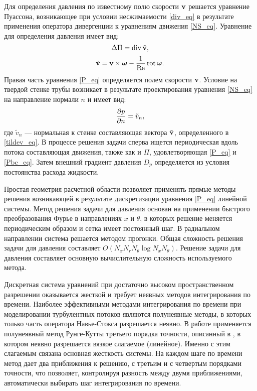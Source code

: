 Для определения давления по известному полю скорости $\mathbf{v}$ решается уравнение Пуассона, возникающее при условии несжимаемости \eqref{div_eq} в результате применения оператора дивергенции к уравнениям движения \eqref{NS_eq}. Уравнение для определения давления имеет вид:
\begin{equation}\label{P_eq}
\mathop{}\!\Delta \Pi = \mathop{}\!\operatorname{div} \tilde {\mathbf{v}},
\end{equation}
\begin{equation}\label{tildev_eq}
\tilde {\mathbf{v}} =  \mathbf{v} \times \mbox{\boldmath$\omega$} - \frac{1}{\operatorname{Re}} \mathop{}\!\operatorname{rot} \mbox{\boldmath$\omega$}.
\end{equation}
Правая часть уравнения \eqref{P_eq} определяется полем скорости $\mathbf{v}$. Условие на твердой стенке трубы возникает в результате проектирования уравнения \eqref{NS_eq} на направление нормали $n$ и имеет вид:
\begin{equation}\label{Pbc_eq}
\frac{\partial p}{\partial n} = \tilde v_n,
\end{equation}
где $\tilde v_n$ --- нормальная к стенке составляющая вектора $\tilde{\mathbf{v}}$, определенного в \eqref{tildev_eq}. В процессе решения задачи сперва ищется периодическая вдоль потока составляющая движения, также как и $\Pi$, удовлетворяющая \eqref{P_eq} и \eqref{Pbc_eq}. Затем внешний градиент давления $D_p$ определяется из условия постоянства расхода жидкости.


Простая геометрия расчетной области позволяет применять прямые методы решения возникающей в результате дискретизации уравнения \eqref{P_eq} линейной системы. Метод решения задачи для давления основан на применении быстрого преобразования Фурье в направлениях $x$ и $\theta$, в которых решение меняется периодическим образом и сетка имеет постоянный шаг. В радиальном направлении система решается методом прогонки. Общая сложность решения задачи для давления составляет $O(N_x N_r N_\theta \log N_x N_\theta)$. Решение задачи для давления составляет основную вычислительную сложность используемого метода. 

Дискретная система уравнений при достаточно высоком пространственном разрешении оказывается жесткой и требует неявных методов интегрирования по времени. Наиболее эффективными методами интегрирования по времени при моделировании турбулентных потоков являются полунеявные методы, в которых только часть оператора Навье-Стокса разрешается неявно. В работе применяется полунеявный метод Рунге-Кутты третьего порядка точности, описанный в \cite{Nikitin2006third}, в котором неявно разрешается вязкое слагаемое (линейное). Именно с этим слагаемым связана основная жесткость системы. На каждом шаге по времени метод дает два приближения к решению, с третьим и с четвертым порядками точности, что позволяет, контролируя разность между двумя приближениями, автоматически выбирать шаг интегрирования по времени. 



